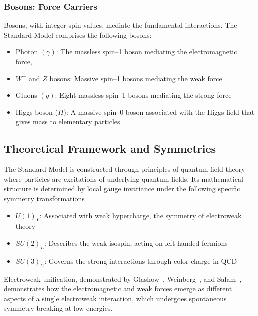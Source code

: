 \begin{definition}
\subsubsection{Bosons: Force Carriers}
Bosons, with integer spin values, mediate the fundamental interactions. The Standard Model comprises the following bosons:
\begin{itemize}
    \item Photon $(\gamma)$: The massless spin--1 boson mediating the electromagnetic force,
    \item $W^\pm$ and $Z$ bosons: Massive spin--1 bosons mediating the weak force
    \item Gluons $(g)$: Eight massless spin--1 bosons mediating the strong force
    \item Higgs boson ($H$): A massive spin--0 boson associated with the Higgs field that gives mass to elementary particles
\end{itemize}

\subsection{Theoretical Framework and Symmetries}
The Standard Model is constructed through principles of quantum field theory where particles are excitations of underlying quantum fields.
%
Its mathematical structure is determined by local gauge invariance under the following specific symmetry transformations
\begin{itemize}
    \item $U(1)_Y$: Associated with weak hypercharge, the symmetry of electroweak theory
    \item $SU(2)_L$: Describes the weak isospin, acting on left-handed fermions
    \item $SU(3)_C$: Governs the strong interactions through color charge in QCD
\end{itemize}

Electroweak unification, demonstrated by Glashow~\cite{Glashow:1961tr}, Weinberg~\cite{Weinberg:1979pi}, and Salam~\cite{Salam:1980jd}, demonstrates how the electromagnetic and weak forces emerge as different aspects of a single electroweak interaction, which undergoes spontaneous symmetry breaking at low energies.


\end{definition}
